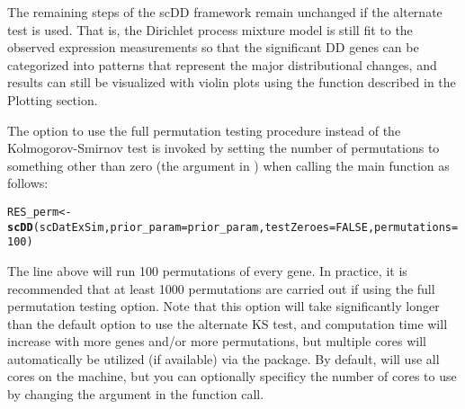 \documentclass{article}\usepackage[]{graphicx}\usepackage[]{color}
\makeatletter
\newcommand{\hlnum}[1]{\textcolor[rgb]{0.686,0.059,0.569}{#1}}%
\newcommand{\hlstd}[1]{\textcolor[rgb]{0.345,0.345,0.345}{#1}}%
\newcommand{\hlkwb}[1]{\textcolor[rgb]{0.69,0.353,0.396}{#1}}%
\newcommand{\hlkwc}[1]{\textcolor[rgb]{0.333,0.667,0.333}{#1}}%
\newcommand{\hlkwd}[1]{\textcolor[rgb]{0.737,0.353,0.396}{\textbf{#1}}}%
\newenvironment{kframe}{%
 \def\at@end@of@kframe{}%
 \ifinner\ifhmode%
  \def\at@end@of@kframe{\end{minipage}}%
  \begin{minipage}{\columnwidth}%
 \fi\fi%
 \def\FrameCommand##1{\hskip\@totalleftmargin \hskip-\fboxsep
 \colorbox{shadecolor}{##1}\hskip-\fboxsep
     \hskip-\linewidth \hskip-\@totalleftmargin \hskip\columnwidth}%
 \MakeFramed {\advance\hsize-\width
   \@totalleftmargin\z@ \linewidth\hsize
   \@setminipage}}%
 {\par\unskip\endMakeFramed%
 \at@end@of@kframe}
\newenvironment{knitrout}{}{} %
\makeatother
\begin{document}
The remaining steps of the scDD framework remain unchanged if the alternate test is used.  That is, the Dirichlet process mixture model is still fit to the observed expression measurements so that the significant DD genes can be categorized into patterns that represent the major distributional changes, and results can still be visualized with violin plots using the  function described in the Plotting section.  

The option to use the full permutation testing procedure instead of the Kolmogorov-Smirnov test is invoked by setting the number of permutations to something other than zero (the  argument in ) when calling the main  function as follows:

\begin{knitrout}
\color{fgcolor}\begin{kframe}
\begin{alltt}
\hlstd{RES_perm} \hlkwb{<-} \hlkwd{scDD}\hlstd{(scDatExSim,} \hlkwc{prior_param}\hlstd{=prior_param,} \hlkwc{testZeroes}\hlstd{=}\hlnum{FALSE}\hlstd{,} \hlkwc{permutations}\hlstd{=}\hlnum{100}\hlstd{)}
\end{alltt}


{\ttfamily\noindent\itshape\color{messagecolor}{\#\# Clustering observed expression data for each gene}}

{\ttfamily\noindent\itshape\color{messagecolor}{\#\# Setting up parallel back-end using 4 cores}}

{\ttfamily\noindent\itshape\color{messagecolor}{\#\# Performing permutations to evaluate independence of clustering and condition for each gene}}

{\ttfamily\noindent\itshape\color{messagecolor}{\#\# Parallelizing by Genes}}

{\ttfamily\noindent\itshape\color{messagecolor}{\#\# Classifying significant genes into patterns}}\end{kframe}
\end{knitrout}

The line above will run 100 permutations of every gene.   In practice, it is recommended that at least 1000 permutations are carried out if using the full permutation testing option.  Note that this option will take significantly longer than the default option to use the alternate KS test, and computation time will increase with more genes and/or more permutations, but multiple cores will automatically be utilized (if available) via the  package.  By default,  will use all cores on the machine, but you can optionally specificy the number of cores to use by changing the  argument in the  function call.
\end{document}
